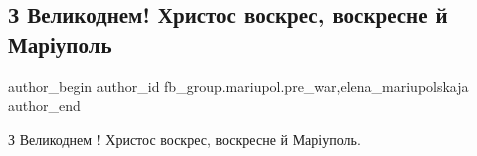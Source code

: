  
 
 
 
 

\subsection{З Великоднем! Христос воскрес, воскресне й Маріуполь}
\label{sec:16_04_2023.fb.fb_group.mariupol.pre_war.2.pysanka_velykden}
 
\ifcmt
 author_begin
   author_id fb_group.mariupol.pre_war,elena_mariupolskaja
 author_end
\fi

З Великоднем ! Христос воскрес, воскресне й Маріуполь.
